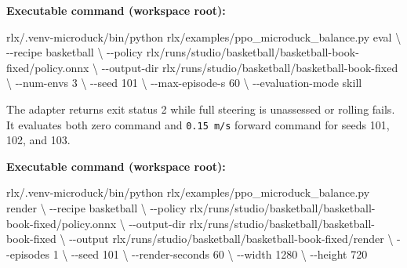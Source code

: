 \documentclass[
  american,
  11pt,
  letterpaper,
]{article}
\newenvironment{Shaded}{\begin{snugshade}}{\end{snugshade}}
\newcommand{\AttributeTok}[1]{\textcolor[rgb]{0.13,0.29,0.53}{#1}}
\newcommand{\DataTypeTok}[1]{\textcolor[rgb]{0.13,0.29,0.53}{#1}}
\newcommand{\ExtensionTok}[1]{#1}
\newcommand{\NormalTok}[1]{#1}
\renewenvironment{Shaded}{\par\smallskip}{\par\smallskip}
\begin{document}
\textbf{Executable command (workspace root):}

\begin{Shaded}
\begin{Highlighting}[]
\ExtensionTok{rlx/.venv{-}microduck/bin/python}\NormalTok{ rlx/examples/ppo\_microduck\_balance.py eval }\DataTypeTok{\textbackslash{}}
  \AttributeTok{{-}{-}recipe}\NormalTok{ basketball }\DataTypeTok{\textbackslash{}}
  \AttributeTok{{-}{-}policy}\NormalTok{ rlx/runs/studio/basketball/basketball{-}book{-}fixed/policy.onnx }\DataTypeTok{\textbackslash{}}
  \AttributeTok{{-}{-}output{-}dir}\NormalTok{ rlx/runs/studio/basketball/basketball{-}book{-}fixed }\DataTypeTok{\textbackslash{}}
  \AttributeTok{{-}{-}num{-}envs}\NormalTok{ 3 }\DataTypeTok{\textbackslash{}}
  \AttributeTok{{-}{-}seed}\NormalTok{ 101 }\DataTypeTok{\textbackslash{}}
  \AttributeTok{{-}{-}max{-}episode{-}s}\NormalTok{ 60 }\DataTypeTok{\textbackslash{}}
  \AttributeTok{{-}{-}evaluation{-}mode}\NormalTok{ skill}
\end{Highlighting}
\end{Shaded}

The adapter returns exit status 2 while full steering is unassessed or
rolling fails. It evaluates both zero command and \texttt{0.15\ m/s}
forward command for seeds 101, 102, and 103.

\textbf{Executable command (workspace root):}

\begin{Shaded}
\begin{Highlighting}[]
\ExtensionTok{rlx/.venv{-}microduck/bin/python}\NormalTok{ rlx/examples/ppo\_microduck\_balance.py render }\DataTypeTok{\textbackslash{}}
  \AttributeTok{{-}{-}recipe}\NormalTok{ basketball }\DataTypeTok{\textbackslash{}}
  \AttributeTok{{-}{-}policy}\NormalTok{ rlx/runs/studio/basketball/basketball{-}book{-}fixed/policy.onnx }\DataTypeTok{\textbackslash{}}
  \AttributeTok{{-}{-}output{-}dir}\NormalTok{ rlx/runs/studio/basketball/basketball{-}book{-}fixed }\DataTypeTok{\textbackslash{}}
  \AttributeTok{{-}{-}output}\NormalTok{ rlx/runs/studio/basketball/basketball{-}book{-}fixed/render }\DataTypeTok{\textbackslash{}}
  \AttributeTok{{-}{-}episodes}\NormalTok{ 1 }\DataTypeTok{\textbackslash{}}
  \AttributeTok{{-}{-}seed}\NormalTok{ 101 }\DataTypeTok{\textbackslash{}}
  \AttributeTok{{-}{-}render{-}seconds}\NormalTok{ 60 }\DataTypeTok{\textbackslash{}}
  \AttributeTok{{-}{-}width}\NormalTok{ 1280 }\DataTypeTok{\textbackslash{}}
  \AttributeTok{{-}{-}height}\NormalTok{ 720}
\end{Highlighting}
\end{Shaded}
\end{document}
